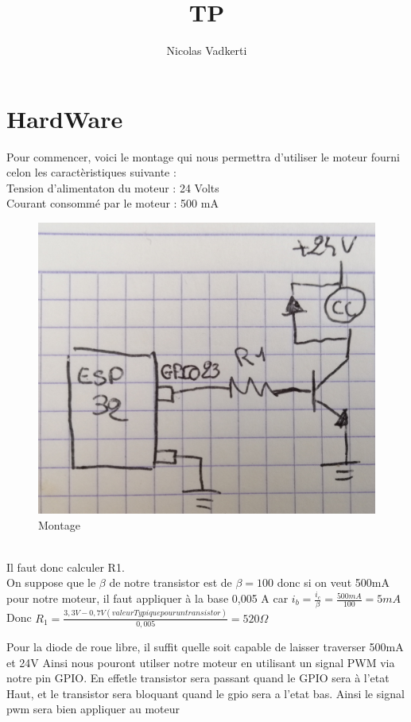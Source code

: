 \documentclass[10pt,a4paper]{article}
\title{TP}
\author{Nicolas Vadkerti}
\begin{document}
\maketitle

\section{HardWare}
Pour commencer, voici le montage qui nous permettra d'utiliser le moteur fourni celon les caractèristiques suivante : \\
Tension d'alimentaton du moteur : 24 Volts\\
Courant consommé par le moteur : 500 mA\\
\begin{figure}[h!]
\centering
\includegraphics[scale=0.20]{image/1.jpg}
\caption{Montage }
\label{fig:net }
\end{figure}\\
Il faut donc calculer R1.\\
On suppose que le $\beta$ de notre transistor est de $\beta =100$ donc si on veut 500mA pour notre moteur, il faut appliquer à la base 0,005 A car 
$i_b=\frac{i_c}{\beta}=\frac{500mA}{100}=5mA $\\
Donc $R_1 = \frac{3,3V -0,7V(valeurTypique pour un transistor)}{0,005}=520\Omega$


Pour la diode de roue libre, il suffit quelle soit capable de laisser traverser 500mA et 24V 
 Ainsi nous pouront utilser notre moteur en utilisant un signal PWM via notre pin GPIO. En effetle transistor sera passant quand le GPIO sera à l'etat Haut, et le transistor sera bloquant quand le gpio sera a l'etat bas. Ainsi le signal pwm sera bien appliquer au moteur
 
\end{document}
